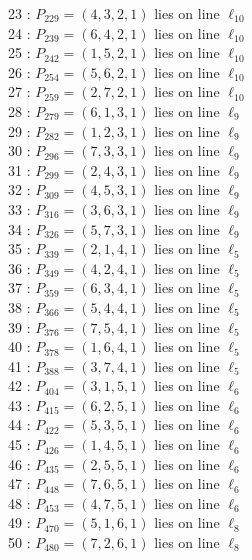 \documentclass{article}
\begin{document}
{\begin{multicols}{2}
23 : $P_{229}=( 4, 3, 2, 1 )$ lies on line $\ell_{10}$\\
24 : $P_{239}=( 6, 4, 2, 1 )$ lies on line $\ell_{10}$\\
25 : $P_{242}=( 1, 5, 2, 1 )$ lies on line $\ell_{10}$\\
26 : $P_{254}=( 5, 6, 2, 1 )$ lies on line $\ell_{10}$\\
27 : $P_{259}=( 2, 7, 2, 1 )$ lies on line $\ell_{10}$\\
28 : $P_{279}=( 6, 1, 3, 1 )$ lies on line $\ell_{9}$\\
29 : $P_{282}=( 1, 2, 3, 1 )$ lies on line $\ell_{9}$\\
30 : $P_{296}=( 7, 3, 3, 1 )$ lies on line $\ell_{9}$\\
31 : $P_{299}=( 2, 4, 3, 1 )$ lies on line $\ell_{9}$\\
32 : $P_{309}=( 4, 5, 3, 1 )$ lies on line $\ell_{9}$\\
33 : $P_{316}=( 3, 6, 3, 1 )$ lies on line $\ell_{9}$\\
34 : $P_{326}=( 5, 7, 3, 1 )$ lies on line $\ell_{9}$\\
35 : $P_{339}=( 2, 1, 4, 1 )$ lies on line $\ell_{5}$\\
36 : $P_{349}=( 4, 2, 4, 1 )$ lies on line $\ell_{5}$\\
37 : $P_{359}=( 6, 3, 4, 1 )$ lies on line $\ell_{5}$\\
38 : $P_{366}=( 5, 4, 4, 1 )$ lies on line $\ell_{5}$\\
39 : $P_{376}=( 7, 5, 4, 1 )$ lies on line $\ell_{5}$\\
40 : $P_{378}=( 1, 6, 4, 1 )$ lies on line $\ell_{5}$\\
41 : $P_{388}=( 3, 7, 4, 1 )$ lies on line $\ell_{5}$\\
42 : $P_{404}=( 3, 1, 5, 1 )$ lies on line $\ell_{6}$\\
43 : $P_{415}=( 6, 2, 5, 1 )$ lies on line $\ell_{6}$\\
44 : $P_{422}=( 5, 3, 5, 1 )$ lies on line $\ell_{6}$\\
45 : $P_{426}=( 1, 4, 5, 1 )$ lies on line $\ell_{6}$\\
46 : $P_{435}=( 2, 5, 5, 1 )$ lies on line $\ell_{6}$\\
47 : $P_{448}=( 7, 6, 5, 1 )$ lies on line $\ell_{6}$\\
48 : $P_{453}=( 4, 7, 5, 1 )$ lies on line $\ell_{6}$\\
49 : $P_{470}=( 5, 1, 6, 1 )$ lies on line $\ell_{8}$\\
50 : $P_{480}=( 7, 2, 6, 1 )$ lies on line $\ell_{8}$\\

\end{multicols}}
\end{document}

